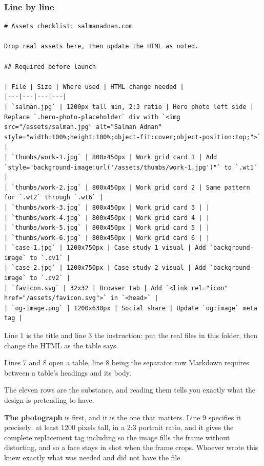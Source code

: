 \subsubsection*{Line by line}

\begin{lstlisting}[firstnumber=1,caption={\file{ASSETS.md}, lines 1--19}]
# Assets checklist: salmanadnan.com

Drop real assets here, then update the HTML as noted.

## Required before launch

| File | Size | Where used | HTML change needed |
|---|---|---|---|
| `salman.jpg` | 1200px tall min, 2:3 ratio | Hero photo left side | Replace `.hero-photo-placeholder` div with `<img src="/assets/salman.jpg" alt="Salman Adnan" style="width:100%;height:100%;object-fit:cover;object-position:top;">` |
| `thumbs/work-1.jpg` | 800x450px | Work grid card 1 | Add `style="background-image:url('/assets/thumbs/work-1.jpg')"` to `.wt1` |
| `thumbs/work-2.jpg` | 800x450px | Work grid card 2 | Same pattern for `.wt2` through `.wt6` |
| `thumbs/work-3.jpg` | 800x450px | Work grid card 3 | |
| `thumbs/work-4.jpg` | 800x450px | Work grid card 4 | |
| `thumbs/work-5.jpg` | 800x450px | Work grid card 5 | |
| `thumbs/work-6.jpg` | 800x450px | Work grid card 6 | |
| `case-1.jpg` | 1200x750px | Case study 1 visual | Add `background-image` to `.cv1` |
| `case-2.jpg` | 1200x750px | Case study 2 visual | Add `background-image` to `.cv2` |
| `favicon.svg` | 32x32 | Browser tab | Add `<link rel="icon" href="/assets/favicon.svg">` in `<head>` |
| `og-image.png` | 1200x630px | Social share | Update `og:image` meta tag |
\end{lstlisting}

Line 1 is the title and line 3 the instruction: put the real files in this folder,
then change the HTML as the table says.

Lines 7 and 8 open a table, line 8 being the separator row Markdown requires between
a table's headings and its body.

The eleven rows are the substance, and reading them tells you exactly what the
design is pretending to have.

\textbf{The photograph} is first, and it is the one that matters. Line 9 specifies
it precisely: at least 1200 pixels tall, in a 2:3 portrait ratio, and it gives the
complete replacement tag including  so the image fills the
frame without distorting, and  so a face stays in shot
when the frame crops. Whoever wrote this knew exactly what was needed and did not
have the file.

